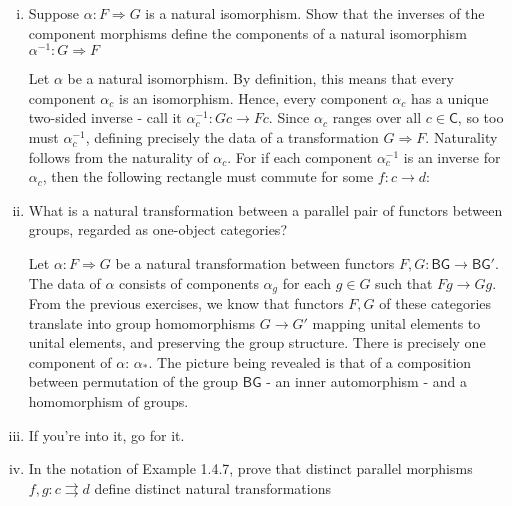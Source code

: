 \documentclass[10pt, oneside]{article}   	%
\newcommand{\cat}[1]{\bm{ \mathsf{#1} }}
\newcommand{\cc}{\cat{C}}
\newcommand{\bg}{\cat{BG}}
\newcommand{\bgg}{\cat{BG'}}
\newcommand{\nt}{\Rightarrow}
\newcommand{\ant}[2]{\alpha : F \nt G}
\begin{document}
\begin{enumerate}[(i)]
\item Suppose $\ant{F}{G}$ is a natural isomorphism. Show that the inverses of the component morphisms define the components of a natural isomorphism $\alpha^{-1} : G \Rightarrow F$

Let $\alpha$ be a natural isomorphism. By definition, this means that every component $\alpha_c$ is an isomorphism. Hence, every component $\alpha_c$ has a unique two-sided inverse - call it $\alpha^{-1}_c : Gc \to Fc$. Since $\alpha_c$ ranges over all $c \in \cc$, so too must $\alpha^{-1}_c$, defining precisely the data of a transformation $G \Rightarrow F$. Naturality follows from the naturality of $\alpha_c$. For if each component $\alpha^{-1}_c$ is an inverse for $\alpha_c$, then the following rectangle must commute for some $f : c \to d$: 

\begin{center}
\end{center}

\item What is a natural transformation between a parallel pair of functors between groups, regarded as one-object categories? 

Let $\ant{F}{G}$ be a natural transformation between functors $F, G: \bg \to \bgg$. The data of $\alpha$ consists of components $\alpha_g$ for each $g \in G$ such that $Fg \to Gg$. From the previous exercises, we know that functors $F, G$ of these categories translate into group homomorphisms $G \to G'$ mapping unital elements to unital elements, and preserving the group structure. There is precisely one component of $\alpha$:  $\alpha_*$. The picture being revealed is that of a composition between permutation of the group $\bg$ - an inner automorphism - and a homomorphism of groups. 

\item If you're into it, go for it.

\item In the notation of Example 1.4.7, prove that distinct parallel morphisms $f,g : c \rightrightarrows d$ define distinct natural transformations 


\end{enumerate}
\end{document}
